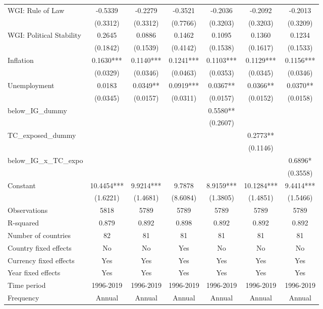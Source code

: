 \documentclass[10pt]{article}
\begin{document}
\begin{table}[h!]
\begin{threeparttable}
\begin{tabular}{lcccccc}
    WGI: Rule of Law & -0.5339 & -0.2279 & -0.3521 & -0.2036 & -0.2092 & -0.2013 \\
     & (0.3312) & (0.3312) & (0.7766) & (0.3203) & (0.3203) & (0.3209) \\[2pt]
    WGI: Political Stability & 0.2645 & 0.0886 & 0.1462 & 0.1095 & 0.1360 & 0.1234 \\
     & (0.1842) & (0.1539) & (0.4142) & (0.1538) & (0.1617) & (0.1533) \\[2pt]
    Inflation & 0.1630*** & 0.1140*** & 0.1241*** & 0.1103*** & 0.1129*** & 0.1156*** \\
     & (0.0329) & (0.0346) & (0.0463) & (0.0353) & (0.0345) & (0.0346) \\[2pt]
    Unemployment & 0.0183 & 0.0349** & 0.0919*** & 0.0367** & 0.0366** & 0.0370** \\
     & (0.0345) & (0.0157) & (0.0311) & (0.0157) & (0.0152) & (0.0158) \\[2pt]
    below\_IG\_dummy &  &  &  & 0.5580** &  &  \\
     &  &  &  & (0.2607) &  &  \\[2pt]
    TC\_exposed\_dummy &  &  &  &  & 0.2773** &  \\
     &  &  &  &  & (0.1146) &  \\[2pt]
    below\_IG\_x\_TC\_expo &  &  &  &  &  & 0.6896* \\
     &  &  &  &  &  & (0.3558) \\[2pt]
    \midrule
    Constant & 10.4454*** & 9.9214*** & 9.7878 & 8.9159*** & 10.1284*** & 9.4414*** \\
     & (1.6221) & (1.4681) & (8.6084) & (1.3805) & (1.4851) & (1.5466) \\[2pt]
    Observations & 5818 & 5789 & 5789 & 5789 & 5789 & 5789 \\
    R-squared & 0.879 & 0.892 & 0.898 & 0.892 & 0.892 & 0.892 \\
    Number of countries & 82 & 81 & 81 & 81 & 81 & 81 \\
    Country fixed effects & No & No & Yes & No & No & No \\
    Currency fixed effects & Yes & Yes & Yes & Yes & Yes & Yes \\
    Year fixed effects & Yes & Yes & Yes & Yes & Yes & Yes \\
    Time period & 1996-2019 & 1996-2019 & 1996-2019 & 1996-2019 & 1996-2019 & 1996-2019 \\
    Frequency & Annual & Annual & Annual & Annual & Annual & Annual \\

\end{tabular}
\end{threeparttable}
\end{table}
\end{document}
